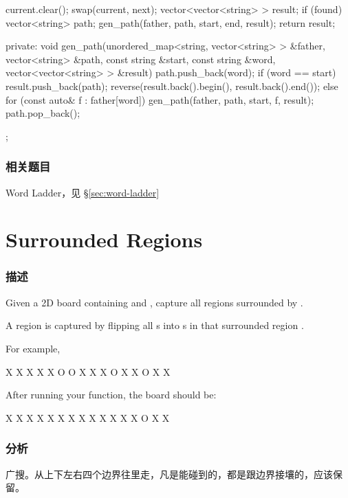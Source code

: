 \begin{Code}
{{{            current.clear();
            swap(current, next);
        }
        vector<vector<string> > result;
        if (found) {
            vector<string> path;
            gen_path(father, path, start, end, result);
        }
        return result;
    }

private:
    void gen_path(unordered_map<string, vector<string> > &father,
            vector<string> &path, const string &start, const string &word,
            vector<vector<string> > &result) {
        path.push_back(word);
        if (word == start) {
            result.push_back(path);
            reverse(result.back().begin(), result.back().end());
        } else {
            for (const auto& f : father[word]) {
                gen_path(father, path, start, f, result);
            }
        }
        path.pop_back();
    }
};
\end{Code}


\subsubsection{相关题目}

\begindot
\item Word Ladder，见 \S \ref{sec:word-ladder}
\myenddot


\section{Surrounded Regions} %
\label{sec:surrounded-regions}


\subsubsection{描述}
Given a 2D board containing  and , capture all regions surrounded by .

A region is captured by flipping all s into s in that surrounded region .

For example,
\begin{Code}
X X X X
X O O X
X X O X
X O X X
\end{Code}

After running your function, the board should be:
\begin{Code}
X X X X
X X X X
X X X X
X O X X
\end{Code}


\subsubsection{分析}
广搜。从上下左右四个边界往里走，凡是能碰到的，都是跟边界接壤的，应该保留。


